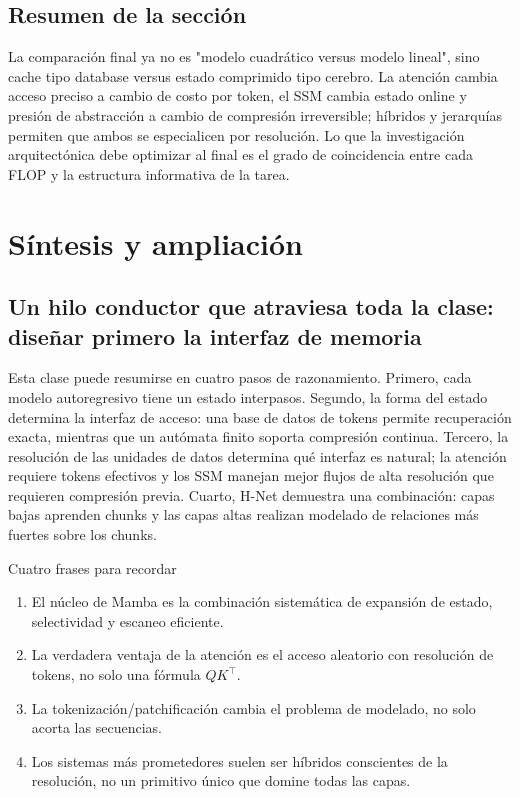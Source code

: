 \documentclass[a4paper]{article}
\begin{document}
\subsection{Resumen de la sección}

La comparación final ya no es "modelo cuadrático versus modelo lineal", sino cache tipo database versus estado comprimido tipo cerebro. La atención cambia acceso preciso a cambio de costo por token, el SSM cambia estado online y presión de abstracción a cambio de compresión irreversible; híbridos y jerarquías permiten que ambos se especialicen por resolución. Lo que la investigación arquitectónica debe optimizar al final es el grado de coincidencia entre cada FLOP y la estructura informativa de la tarea.
\section{Síntesis y ampliación}

\subsection{Un hilo conductor que atraviesa toda la clase: diseñar primero la interfaz de memoria}

Esta clase puede resumirse en cuatro pasos de razonamiento. Primero, cada modelo autoregresivo tiene un estado interpasos. Segundo, la forma del estado determina la interfaz de acceso: una base de datos de tokens permite recuperación exacta, mientras que un autómata finito soporta compresión continua. Tercero, la resolución de las unidades de datos determina qué interfaz es natural; la atención requiere tokens efectivos y los SSM manejan mejor flujos de alta resolución que requieren compresión previa. Cuarto, H-Net demuestra una combinación: capas bajas aprenden chunks y las capas altas realizan modelado de relaciones más fuertes sobre los chunks.

\begin{importantbox}{Cuatro frases para recordar}
\begin{enumerate}
  \item El núcleo de Mamba es la combinación sistemática de expansión de estado, selectividad y escaneo eficiente.
  \item La verdadera ventaja de la atención es el acceso aleatorio con resolución de tokens, no solo una fórmula $QK^\top$.
  \item La tokenización/patchificación cambia el problema de modelado, no solo acorta las secuencias.
  \item Los sistemas más prometedores suelen ser híbridos conscientes de la resolución, no un primitivo único que domine todas las capas.
\end{enumerate}
\end{importantbox}
\end{document}
